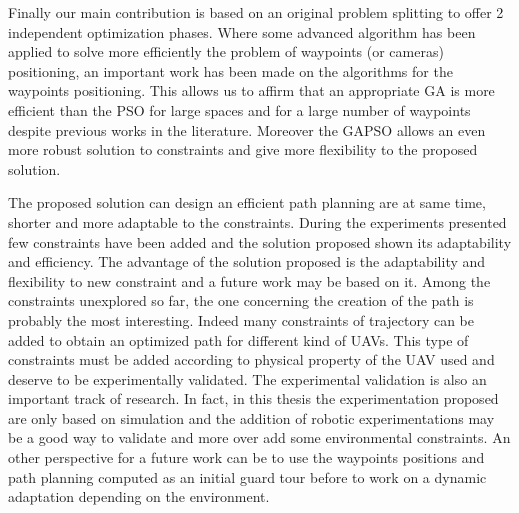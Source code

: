 Finally  our main contribution is based on an original problem splitting to offer 2 independent optimization phases. Where some advanced algorithm has been applied to solve more efficiently the problem of waypoints (or cameras) positioning, an important work has been made on the algorithms for the waypoints positioning. This allows us to affirm that an appropriate GA is more efficient than the PSO for large spaces and for a large number of waypoints despite previous works in the literature. Moreover the GAPSO allows an even more robust solution to constraints and give more flexibility to the proposed solution. 

The proposed solution can design an efficient path planning are at same time, shorter and more adaptable to the constraints. During the experiments presented few constraints have been added and the solution proposed shown its adaptability and efficiency. 
The advantage of the solution proposed is the adaptability and flexibility to new constraint and  a future work may be based on it. %
Among the constraints unexplored so far, the one concerning the creation of the path is probably the most interesting.  Indeed many constraints of trajectory can be added to obtain an optimized path for different kind of UAVs. This type of constraints must be added according to physical property of the UAV used and deserve to be experimentally validated. 
The experimental validation is also an important track of research. In fact, in this thesis the experimentation proposed are only based on simulation and the addition of robotic experimentations may be a good way to validate and more over add some environmental constraints.  
An other perspective for a future work can be to use the waypoints positions and path planning computed as an initial guard tour before to work on a dynamic adaptation depending on the environment.




